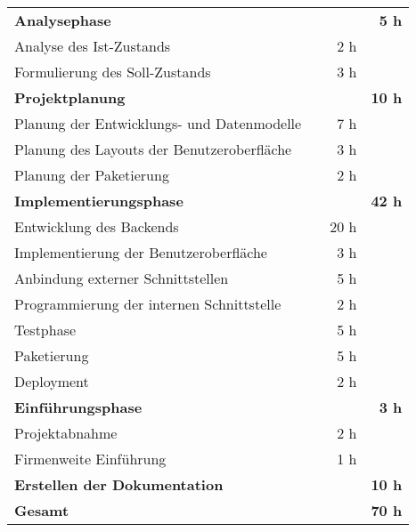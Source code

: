 \begin{tabularx}{\textwidth}{Xrrr}
\rowcolor{heading}\textbf{Analysephase} & \textbf{} & \textbf{} & \textbf{5 h} \\
Analyse des Ist-Zustands &       & 2 h   &  \\
\rowcolor{odd}Formulierung des Soll-Zustands &       & 3 h   &  \\
\rowcolor{heading}\textbf{Projektplanung} & \textbf{} & \textbf{} & \textbf{10 h} \\
Planung der Entwicklungs- und Datenmodelle &       & 7 h   &  \\
\rowcolor{odd}Planung des Layouts der Benutzeroberfläche &       & 3 h   &  \\
Planung der Paketierung &       & 2 h   &  \\
\rowcolor{heading}\textbf{Implementierungsphase} & \textbf{} & \textbf{} & \textbf{42 h} \\
Entwicklung des Backends &       & 20 h   &  \\
\rowcolor{odd} Implementierung der Benutzeroberfläche &       & 3 h   &  \\
Anbindung externer Schnittstellen &       & 5 h  &  \\
\rowcolor{odd}Programmierung der internen Schnittstelle &       & 2 h   &  \\
Testphase &       & 5 h   &  \\
\rowcolor{odd}Paketierung &       & 5 h   &  \\
Deployment &       & 2 h   &  \\
\rowcolor{heading}\textbf{Einführungsphase} & \textbf{} & \textbf{} & \textbf{3 h} \\
Projektabnahme &       & 2 h   &  \\
\rowcolor{odd}Firmenweite Einführung &      & 1 h   &  \\
\rowcolor{heading}\textbf{Erstellen der Dokumentation} & \textbf{} & \textbf{} & \textbf{10 h} \\
\hline
\hline
\rowcolor{odd}\textbf{Gesamt} & \textbf{} & \textbf{} & \textbf{70 h} \\
\end{tabularx}
